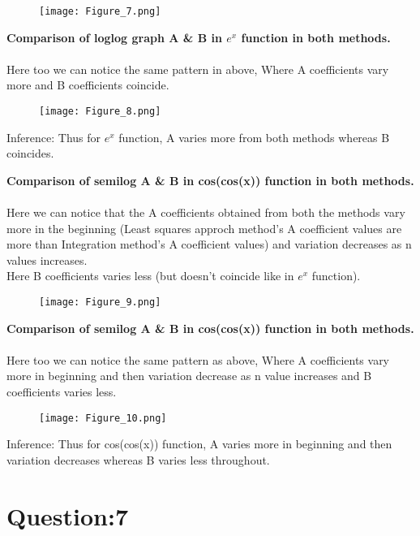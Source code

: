 \documentclass[12pt]{article}
\begin{document}
\begin{figure}[h!]
\centering
\texttt{[image: Figure\_7.png]}
\label{fig:exemplo}
\end{figure}

\textbf{Comparison of loglog graph A \& B in $e^x$ function in both methods.}\\\\
Here too we can notice the same pattern in above, Where A coefficients vary more and B coefficients coincide.

\begin{figure}[h!]
\centering
\texttt{[image: Figure\_8.png]}
\label{fig:exemplo}
\end{figure}
Inference: Thus for $e^x$ function, A varies more from both methods whereas B coincides.

\newpage
\textbf{Comparison of semilog A \& B in cos(cos(x)) function in both methods.}\\\\
Here we can notice that the A coefficients obtained from both the methods vary more in the beginning (Least squares approch method's A coefficient values are more than Integration method's A coefficient values) and variation decreases as n values increases.\\
Here B coefficients varies less (but doesn't coincide like in $e^x$ function).

\begin{figure}[h!]
\centering
\texttt{[image: Figure\_9.png]}
\label{fig:exemplo}
\end{figure}

\textbf{Comparison of semilog A \& B in cos(cos(x)) function in both methods.}\\\\
Here too we can notice the same pattern as above, Where A coefficients vary more in beginning and then variation decrease as n value increases and B coefficients varies less.

\begin{figure}[h!]
\centering
\texttt{[image: Figure\_10.png]}
\label{fig:exemplo}
\end{figure}

Inference: Thus for cos(cos(x)) function, A varies more in beginning and then variation decreases whereas B varies less throughout.


\newpage
\section*{Question:7}
\end{document}
